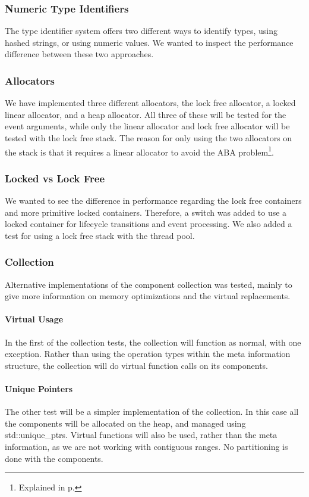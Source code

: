 \subsubsection{Numeric Type Identifiers}
The type identifier system offers two different ways to identify types, using
hashed strings, or using numeric values.
We wanted to inspect the performance difference between these two approaches.

\subsubsection{Allocators}
We have implemented three different allocators, the lock free allocator,
a locked linear allocator, and a heap allocator.
All three of these will be tested for the event arguments, while only the
linear allocator and lock free allocator will be tested with the lock free stack.
The reason for only using the two allocators on the stack is that it requires
a linear allocator to avoid the ABA problem\footnote{Explained in p.\pageref{subpar:detailed_lock_free_allocator_aba}}.

\subsubsection{Locked vs Lock Free}
We wanted to see the difference in performance regarding the lock free containers
and more primitive locked containers.
Therefore, a switch was added to use a locked container for lifecycle transitions and event processing.
We also added a test for using a lock free stack with the thread pool.

\subsubsection{Collection}
Alternative implementations of the component collection was tested,
mainly to give more information on memory optimizations and the virtual
replacements.

\paragraph{Virtual Usage}
In the first of the collection tests, the collection will function as normal, with one exception.
Rather than using the operation types within the meta information structure,
the collection will do virtual function calls on its components.

\paragraph{Unique Pointers}
The other test will be a simpler implementation of the collection.
In this case all the components will be allocated on the heap, and managed
using std::unique\_ptrs.
Virtual functions will also be used, rather than the meta information,
as we are not working with contiguous ranges.
No partitioning is done with the components.

